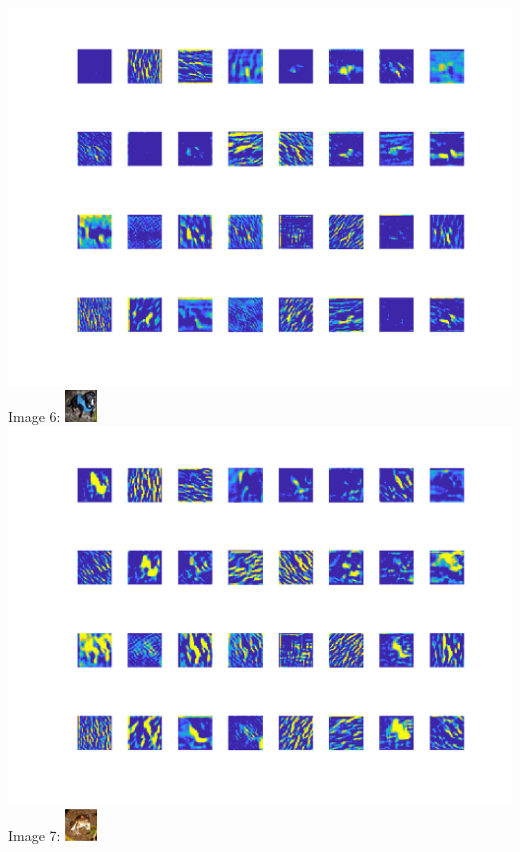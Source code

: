 \documentclass[10pt]{article}
\begin{document}
\includegraphics[scale=0.65]{5_filter_res}\\
\newpage
Image 6:
\includegraphics{6}\\
\includegraphics[scale=0.65]{6_filter_res}\\
Image 7:
\includegraphics{7}\\
\end{document}
